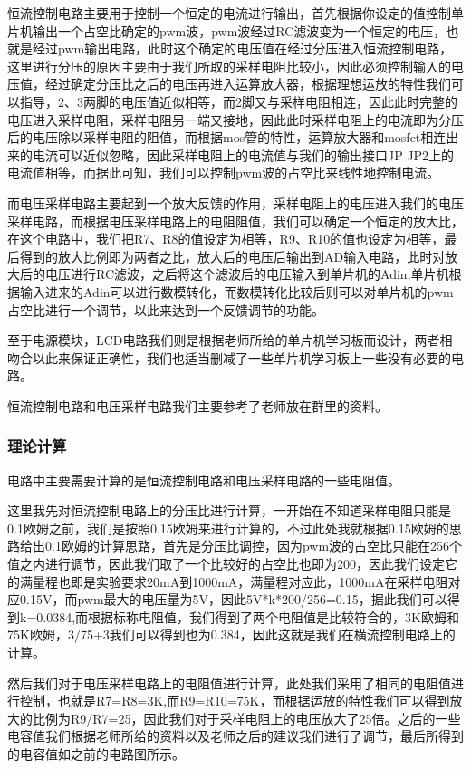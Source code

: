 \documentclass{zjureport}
\begin{document}
        恒流控制电路主要用于控制一个恒定的电流进行输出，首先根据你设定的值控制单片机输出一个占空比确定的pwm波，pwm波经过RC滤波变为一个恒定的电压，也就是经过pwm输出电路，此时这个确定的电压值在经过分压进入恒流控制电路，这里进行分压的原因主要由于我们所取的采样电阻比较小，因此必须控制输入的电压值，经过确定分压比之后的电压再进入运算放大器，根据理想运放的特性我们可以指导，2、3两脚的电压值近似相等，而2脚又与采样电阻相连，因此此时完整的电压进入采样电阻，采样电阻另一端又接地，因此此时采样电阻上的电流即为分压后的电压除以采样电阻的阻值，而根据mos管的特性，运算放大器和mosfet相连出来的电流可以近似忽略，因此采样电阻上的电流值与我们的输出接口JP JP2上的电流值相等，而据此可知，我们可以控制pwm波的占空比来线性地控制电流。

        而电压采样电路主要起到一个放大反馈的作用，采样电阻上的电压进入我们的电压采样电路，而根据电压采样电路上的电阻阻值，我们可以确定一个恒定的放大比，在这个电路中，我们把R7、R8的值设定为相等，R9、R10的值也设定为相等，最后得到的放大比例即为两者之比，放大后的电压后输出到AD输入电路，此时对放大后的电压进行RC滤波，之后将这个滤波后的电压输入到单片机的Adin,单片机根据输入进来的Adin可以进行数模转化，而数模转化比较后则可以对单片机的pwm占空比进行一个调节，以此来达到一个反馈调节的功能。

        至于电源模块，LCD电路我们则是根据老师所给的单片机学习板而设计，两者相吻合以此来保证正确性，我们也适当删减了一些单片机学习板上一些没有必要的电路。

        恒流控制电路和电压采样电路我们主要参考了老师放在群里的资料。

        \subsubsection{理论计算}
        电路中主要需要计算的是恒流控制电路和电压采样电路的一些电阻值。
   
        这里我先对恒流控制电路上的分压比进行计算，一开始在不知道采样电阻只能是0.1欧姆之前，我们是按照0.15欧姆来进行计算的，不过此处我就根据0.15欧姆的思路给出0.1欧姆的计算思路，首先是分压比调控，因为pwm波的占空比只能在256个值之内进行调节，因此我们取了一个比较好的占空比也即为200，因此我们设定它的满量程也即是实验要求20mA到1000mA，满量程对应此，1000mA在采样电阻对应0.15V，而pwm最大的电压量为5V，因此5V*k*200/256=0.15，据此我们可以得到k=0.0384,而根据标称电阻值，我们得到了两个电阻值是比较符合的，3K欧姆和75K欧姆，3/75+3我们可以得到也为0.384，因此这就是我们在横流控制电路上的计算。
  
        然后我们对于电压采样电路上的电阻值进行计算，此处我们采用了相同的电阻值进行控制，也就是R7=R8=3K,而R9=R10=75K，而根据运放的特性我们可以得到放大的比例为R9/R7=25，因此我们对于采样电阻上的电压放大了25倍。之后的一些电容值我们根据老师所给的资料以及老师之后的建议我们进行了调节，最后所得到的电容值如之前的电路图所示。
  
\end{document}
